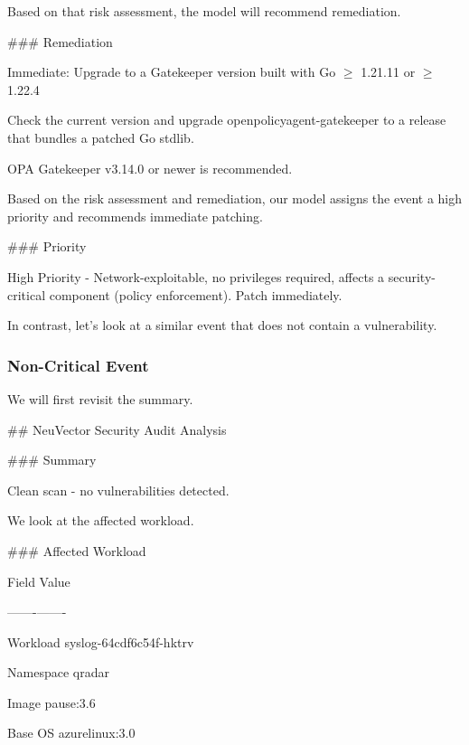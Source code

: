 Based on that risk assessment, the model will recommend remediation.

\indent\colorbox{codegrey}{
    \parbox{0.8\linewidth}{
\#\#\# Remediation

Immediate: Upgrade to a Gatekeeper version built with Go $\ge$ 1.21.11 or $\ge$ 1.22.4

Check the current version and upgrade openpolicyagent-gatekeeper to a release that bundles a patched Go stdlib. 

OPA Gatekeeper v3.14.0 or newer is recommended.
    }
}

Based on the risk assessment and remediation, our model assigns the event a high priority and recommends immediate patching.

\indent\colorbox{codegrey}{
    \parbox{0.8\linewidth}{
\#\#\# Priority

High Priority - Network-exploitable, no privileges required, affects a security-critical component (policy enforcement). Patch immediately.
    }
}

In contrast, let's look at a similar event that does not contain a vulnerability.

\subsubsection{Non-Critical Event}

We will first revisit the summary.

\indent\colorbox{codegrey}{
    \parbox{0.8\linewidth}{
\#\# NeuVector Security Audit Analysis
    }
}

\indent\colorbox{codegrey}{
    \parbox{0.8\linewidth}{
\#\#\# Summary

Clean scan - no vulnerabilities detected.
     }
}

We look at the affected workload.

\indent\colorbox{codegrey}{
    \parbox{0.8\linewidth}{
\#\#\# Affected Workload

\textbar{} Field \textbar{} Value \textbar{}

\textbar{}-------\textbar{}-------\textbar{}

\textbar{} Workload \textbar{} syslog-64cdf6c54f-hktrv \textbar{}

\textbar{} Namespace \textbar{} qradar \textbar{}

\textbar{} Image \textbar{} pause:3.6 \textbar{}

\textbar{} Base OS \textbar{} azurelinux:3.0 \textbar{}
     }
}

